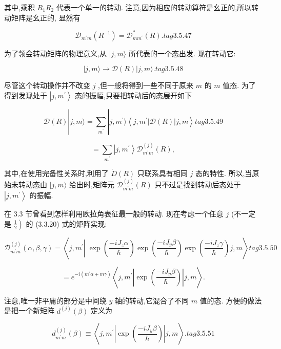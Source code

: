 其中,乘积 ${R}_{1}{R}_{2}$ 代表一个单一的转动. 注意,因为相应的转动算符是幺正的,所以转动矩阵是幺正的, 显然有

$$
{\mathcal{D}}_{{m}^{\prime }m}\left( {R}^{-1}\right) = {\mathcal{D}}_{m{m}^{\prime }}^{ * }\left( R\right) . tag{3.5.47}
$$

为了领会转动矩阵的物理意义,从 $|j, m\rangle$ 所代表的一个态出发. 现在转动它:

$$
\left| {j, m\rangle \rightarrow \mathcal{D}\left( R\right) }\right| j, m\rangle . tag{3. 5.48}
$$

尽管这个转动操作并不改变 $j$ ,但一般将得到一些不同于原来 $m$ 的 $m$ 值态. 为了得到发现处于 $\left| {j,{m}^{\prime }}\right\rangle$ 态的振幅,只要把转动后的态展开如下

$$
\mathcal{D}\left( R\right) \left| {j, m\rangle = \mathop{\sum }\limits_{{m}^{\prime }}}\right| j,{m}^{\prime }\rangle \left\langle {j,{m}^{\prime }\left| {\mathcal{D}\left( R\right) }\right| j, m}\right\rangle tag{3. 5.49}
$$

$$
= \mathop{\sum }\limits_{{m}^{\prime }}\left| {j,{m}^{\prime }}\right\rangle {\mathcal{D}}_{{m}^{\prime }m}^{\left( j\right) }\left( R\right) ,
$$

其中,在使用完备性关系时,利用了 $\dot{D}\left( R\right)$ 只联系具有相同 $j$ 态的特性. 所以,当原始未转动态由 $|j, m\rangle$ 给出时,矩阵元 ${\mathcal{D}}_{{m}^{\prime }m}^{\left( j\right) }\left( R\right)$ 只不过是找到转动后态处于 $\left| {j,{m}^{\prime }}\right\rangle$ 的振幅.

在 3.3 节曾看到怎样利用欧拉角表征最一般的转动. 现在考虑一个任意 $j$ (不一定是 $\left. \frac{1}{2}\right)$ 的 (3.3.20) 式的矩阵实现:

$$
{\mathcal{D}}_{{m}^{\prime }m}^{\left( j\right) }\left( {\alpha ,\beta ,\gamma }\right) = \left\langle {j,{m}^{\prime }\left| {\;\exp \left( \frac{-i{J}_{z}\alpha }{\hslash }\right) \exp \left( \frac{-i{J}_{y}\beta }{\hslash }\right) \exp \left( \frac{-i{J}_{z}\gamma }{\hslash }\right) }\right. j, m}\right\rangle tag{3. 5.50}
$$

$$
= {e}^{-i\left( {{m}^{\prime }\alpha + {m\gamma }}\right) }\left\langle {j,{m}^{\prime }\left| {\exp \left( \frac{-i{J}_{y}\beta }{\hslash }\right) }\right| j, m}\right\rangle .
$$

注意,唯一非平庸的部分是中间绕 $y$ 轴的转动,它混合了不同 $m$ 值的态. 方便的做法是把一个新矩阵 ${d}^{\left( j\right) }\left( \beta \right)$ 定义为

$$
{d}_{{m}^{\prime }m}^{\left( j\right) }\left( \beta \right) \equiv \left\langle {j,{m}^{\prime }\left| {\exp \left( \frac{-i{J}_{y}\beta }{\hslash }\right) }\right| j, m}\right\rangle . tag{3. 5.51}
$$

